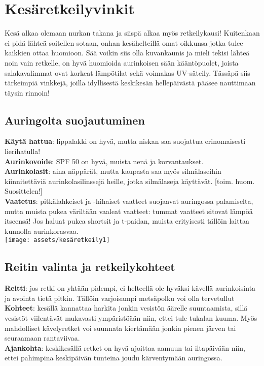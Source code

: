 \section{Kesäretkeilyvinkit}

\begin{multicols}{2}

\noindent Kesä alkaa olemaan nurkan takana ja siispä alkaa myös retkeilykausi! Kuitenkaan ei pidä lähteä soitellen sotaan, onhan kesähelteillä omat oikkunsa jotka tulee kaikkien ottaa huomioon. Sää voikin siis olla kuvankaunis ja mieli tekisi lähteä noin vain retkelle, on hyvä huomioida aurinkoisen sään kääntöpuolet, joista salakavalimmat ovat korkeat lämpötilat sekä voimakas UV-säteily. Tässäpä siis tärkeimpiä vinkkejä, joilla idyllisestä keskikesän hellepäivästä pääsee nauttimaan täysin rinnoin!

\subsection*{Auringolta suojautuminen}

\textbf{Käytä hattua}: lippalakki on hyvä, mutta niskan saa suojattua erinomaisesti lierihatulla!\\
\textbf{Aurinkovoide}: SPF 50 on hyvä, muista nenä ja korvantaukset.\\
\textbf{Aurinkolasit}: aina näppärät, mutta kaupasta saa myös silmälaseihin kiinnitettäviä aurinkolasilinssejä heille, jotka silmälaseja käyttävät. [toim. huom. Suosittelen!]\\
\textbf{Vaatetus}: pitkälahkeiset ja -hihaiset vaatteet suojaavat auringossa palamiselta, mutta muista pukea väriltään vaaleat vaatteet: tummat vaatteet sitovat lämpöä itseensä! Jos haluat pukea shortsit ja t-paidan, muista erityisesti tällöin laittaa kunnolla aurinkorasvaa.\\

{\centering\texttt{[image: assets/kesäretkeily1]}}

\subsection*{Reitin valinta ja retkeilykohteet}

\textbf{Reitti}: jos retki on yhtään pidempi, ei helteellä ole hyväksi kävellä aurinkoisinta ja avointa tietä pitkin. Tällöin varjoisampi metsäpolku voi olla tervetullut\\
\textbf{Kohteet}: kesällä kannattaa harkita jonkin vesistön äärelle suuntaamista, sillä vesistöt viilentävät mukavasti ympäristöään niin, ettei tule tukalan kuuma. Myös mahdolliset kävelyretket voi suunnata kiertämään jonkin pienen järven tai seuraamaan rantaviivaa.\\
\textbf{Ajankohta}: keskikesällä retket on hyvä ajoittaa aamuun tai iltapäivään niin, ettei pahimpina keskipäivän tunteina joudu kärventymään auringossa. \\


\end{multicols}
